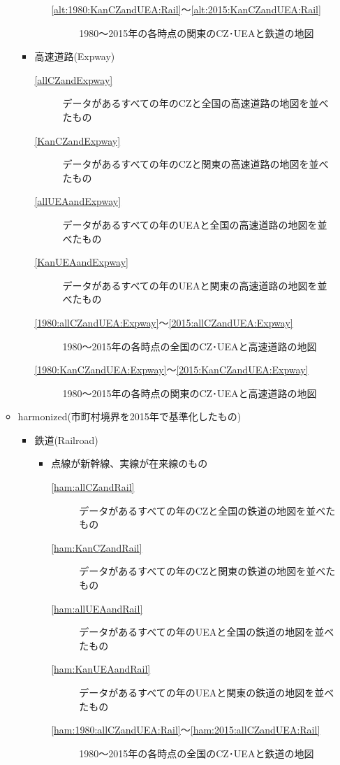 \documentclass{ltjsarticle}
\begin{document}
\begin{itemize}
\begin{itemize}
\begin{itemize}
\begin{itemize}
\begin{description}
          \item[\ref{alt:1980:KanCZandUEA:Rail}～\ref{alt:2015:KanCZandUEA:Rail}] 1980～2015年の各時点の関東のCZ･UEAと鉄道の地図
        \end{description}
      \end{itemize}      
      \item 高速道路(Expway)
      \begin{description}
        \item[\ref{allCZandExpway}] データがあるすべての年のCZと全国の高速道路の地図を並べたもの
        \item[\ref{KanCZandExpway}] データがあるすべての年のCZと関東の高速道路の地図を並べたもの
        \item[\ref{allUEAandExpway}] データがあるすべての年のUEAと全国の高速道路の地図を並べたもの
        \item[\ref{KanUEAandExpway}] データがあるすべての年のUEAと関東の高速道路の地図を並べたもの
        \item[\ref{1980:allCZandUEA:Expway}～\ref{2015:allCZandUEA:Expway}] 1980～2015年の各時点の全国のCZ･UEAと高速道路の地図
        \item[\ref{1980:KanCZandUEA:Expway}～\ref{2015:KanCZandUEA:Expway}] 1980～2015年の各時点の関東のCZ･UEAと高速道路の地図
      \end{description}
    \end{itemize}
    \item harmonized(市町村境界を2015年で基準化したもの)
    \begin{itemize}
      \item 鉄道(Railroad)
      \begin{itemize}
        \item 点線が新幹線、実線が在来線のもの
        \begin{description}
          \item[\ref{ham:allCZandRail}] データがあるすべての年のCZと全国の鉄道の地図を並べたもの
          \item[\ref{ham:KanCZandRail}] データがあるすべての年のCZと関東の鉄道の地図を並べたもの
          \item[\ref{ham:allUEAandRail}] データがあるすべての年のUEAと全国の鉄道の地図を並べたもの
          \item[\ref{ham:KanUEAandRail}] データがあるすべての年のUEAと関東の鉄道の地図を並べたもの
          \item[\ref{ham:1980:allCZandUEA:Rail}～\ref{ham:2015:allCZandUEA:Rail}] 1980～2015年の各時点の全国のCZ･UEAと鉄道の地図

\end{description}
\end{itemize}
\end{itemize}
\end{itemize}
\end{itemize}
\end{document}
